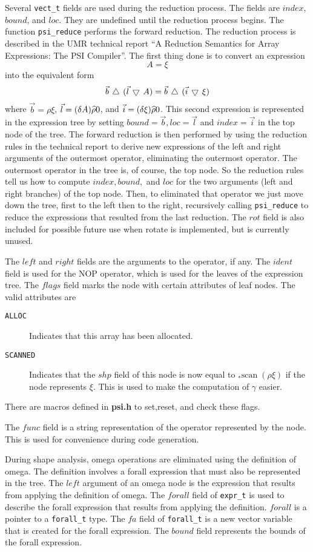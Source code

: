 Several {\tt vect\_t} fields are used during the reduction process.  The fields are
$index$, $bound$, and $loc$.  They are undefined until the reduction
process begins.  The function {\tt psi\_reduce} performs the forward reduction.
The reduction process is described in 
the UMR technical report ``A Reduction Semantics for Array 
Expressions: The PSI Compiler''.  The first thing done
is to convert an expression
$$A=\xi$$ into the equivalent form
$$\vec{b}\,\bigtriangleup\,(\vec{l}\,\bigtriangledown\, A)=\vec{b}\,\bigtriangleup\,(\vec{i}\,\bigtriangledown\, \xi)$$
where $\vec{b}=\rho\xi$, $\vec{l}=(\delta A)\widehat{\rho} 0$, and
$\vec{i}=(\delta\xi)\widehat{\rho} 0$.  This second expression is represented
in the expression tree by setting $bound=\vec{b}, loc=\vec{l}$ and
$index=\vec{i}$ in the top node of the tree.  The forward reduction is
then performed by using the reduction rules in the technical report to derive 
new expressions of the left and right arguments of the outermost operator, 
eliminating the outermost operator.  The outermost operator in the tree
is, of course, the top node.  So the reduction rules tell us how to compute
$index, bound,$ and $loc$ for the two arguments (left and right branches)
of the top node.  Then, to eliminated that operator we just move down the
tree, first to the left then to the right, recursively calling {\tt psi\_reduce}
to reduce the expressions that resulted from the last reduction.  The
$rot$ field is also included for possible future use when rotate is implemented, but
is currently unused.

The $left$ and $right$ fields are the arguments to the operator, if any.
The $ident$ field is used for the NOP operator, which is used for the leaves
of the expression tree.  The $flags$ field marks the node with certain 
attributes of leaf nodes.  The valid attributes are
\begin{description}
\item[{\tt ALLOC}] Indicates that this array has been allocated.
\item[{\tt SCANNED}] Indicates that the $shp$ field of this node is now equal to
$_{*}\mbox{scan}\;(\rho\xi )$ if the node represents $\xi$.  This is used
to make the computation of $\gamma$ easier.
\end{description}
There are macros defined in {\bf psi.h} to set,reset, and check these flags.

The $func$ field is a string representation of the operator represented
by the node.  This is used for convenience during code generation.

During shape analysis, omega operations are eliminated using the
definition of omega.  The definition involves a forall expression that
must also be represented in the tree.  The $left$ argument of an omega
node is the expression that results from applying the definition of omega.
The $forall$ field of {\tt expr\_t} is used to describe the forall expression
that results from applying the definition.  $forall$ is a pointer to a
{\tt forall\_t} type.  The $fa$ field of {\tt forall\_t} is a new vector variable that
is created for the forall expression.  The $bound$ field represents the
bounds of the forall expression.

